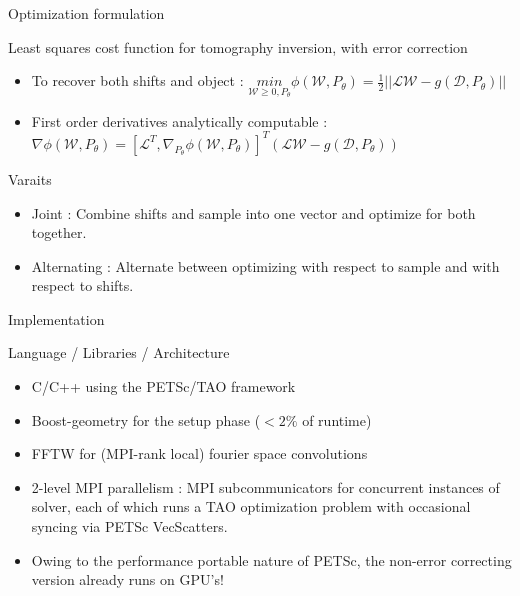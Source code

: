 \documentclass{beamer}
\begin{document}
\begin{frame}{Optimization formulation}
	\begin{block}{Least squares cost function for tomography inversion, with error correction}
		\begin{itemize}
			\item To recover both shifts and object : 
			$\underset{\mathcal{W} \geq 0, P_{\theta}}{\textit{min}}  \phi(\mathcal{W},P_{\theta}) = \frac{1}{2}||\mathcal{L}\mathcal{W} - g(\mathcal{D},P_{\theta})||$
			\item First order derivatives analytically computable :
			$ \nabla \phi(\mathcal{W},P_{\theta}) = [\mathcal{L}^{T},
			\nabla_{P_{\theta}} \phi(\mathcal{W},P_{\theta})]^{T} (\mathcal{L}\mathcal{W} - g(\mathcal{D},P_{\theta}))$
		\end{itemize}
	\end{block}
	\begin{exampleblock}{Varaits}
	\begin{itemize}
		\item Joint : Combine shifts and sample into one vector and optimize for both together.
		\item Alternating : Alternate between optimizing with respect to sample and with respect to shifts.
	\end{itemize}
	\end{exampleblock}
\end{frame}
\begin{frame}{Implementation}
	\begin{block}{Language / Libraries / Architecture}
		\begin{itemize}
			\item C/C++ using the PETSc/TAO framework
			\item Boost-geometry for the setup phase ($<2\%$ of runtime) 
			\item FFTW for (MPI-rank local) fourier space convolutions
			\item 2-level MPI parallelism : MPI subcommunicators for concurrent instances of solver, each of which runs a TAO optimization problem with occasional syncing via PETSc VecScatters.
			\item Owing to the performance portable nature of PETSc, the non-error correcting version already runs on GPU's!
		\end{itemize}
	\end{block}
\end{frame}
\end{document}
